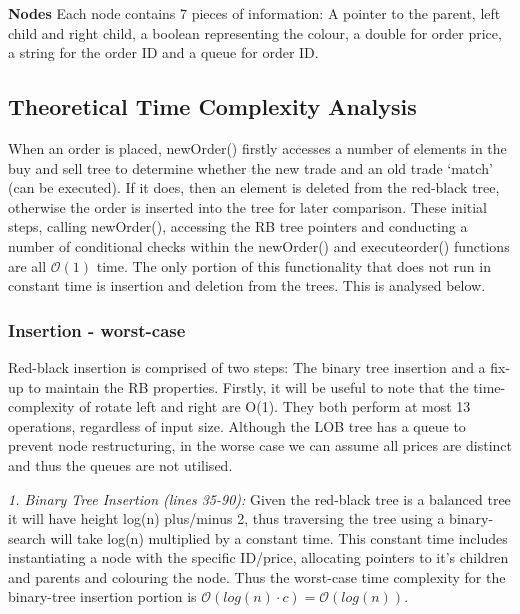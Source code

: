 \documentclass[11p]{article}
\def\nl{\newline}
\def\bb{\bigbreak}
\begin{document}
\textbf{Nodes} \nl
Each node contains 7 pieces of information: A pointer to the parent, left child and right child, a boolean representing the colour, a double for order price, a string for the order ID and a queue for order ID. \nl

\subsection{Theoretical Time Complexity Analysis}

When an order is placed, newOrder() firstly accesses a number of elements in the buy and sell tree to determine whether the new trade and an old trade `match' (can be executed). If it does, then an element is deleted from the red-black tree, otherwise the order is inserted into the tree for later comparison. These initial steps, calling newOrder(), accessing the RB tree pointers and conducting a number of conditional checks within the newOrder() and executeorder() functions are all $\mathcal{O}(1)$ time. The only portion of this functionality that does not run in constant time is insertion and deletion from the trees. This is analysed below.



\subsubsection{Insertion - worst-case}
Red-black insertion is comprised of two steps: The binary tree insertion and a fix-up to maintain the RB properties.  Firstly, it will be useful to note that the time-complexity of rotate left and right are O(1). They both perform at most 13 operations, regardless of input size.
\bb
Although the LOB tree has a queue to prevent node restructuring, in the worse case we can assume all prices are distinct and thus the queues are not utilised. \nl

\textit{1. Binary Tree Insertion (lines 35-90):}\nl
Given the red-black tree is a balanced tree it will have height log(n) plus/minus 2, thus traversing the tree using a binary-search will take log(n) multiplied by a constant time. This constant time includes instantiating a node with the specific ID/price, allocating pointers to it's children and parents and colouring the node. Thus the worst-case time complexity for the binary-tree insertion portion is $\mathcal{O}(log(n) \cdot c) = \mathcal{O}(log(n))$. \nl
\end{document}
